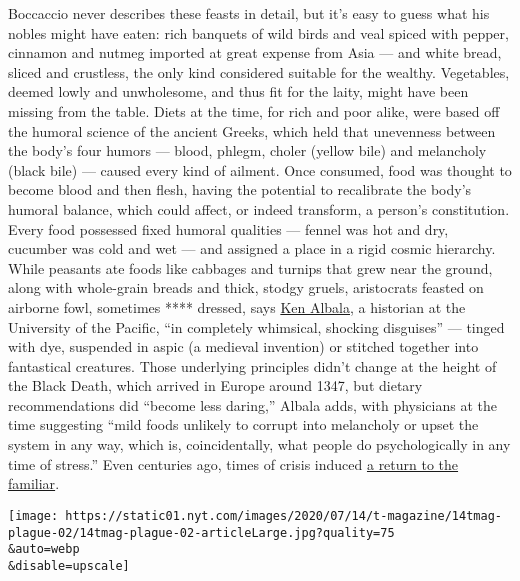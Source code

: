 Boccaccio never describes these feasts in detail, but it's easy to guess
what his nobles might have eaten: rich banquets of wild birds and veal
spiced with pepper, cinnamon and nutmeg imported at great expense from
Asia --- and white bread, sliced and crustless, the only kind considered
suitable for the wealthy. Vegetables, deemed lowly and unwholesome, and
thus fit for the laity, might have been missing from the table. Diets at
the time, for rich and poor alike, were based off the humoral science of
the ancient Greeks, which held that unevenness between the body's four
humors --- blood, phlegm, choler (yellow bile) and melancholy (black
bile) --- caused every kind of ailment. Once consumed, food was thought
to become blood and then flesh, having the potential to recalibrate the
body's humoral balance, which could affect, or indeed transform, a
person's constitution. Every food possessed fixed humoral qualities ---
fennel was hot and dry, cucumber was cold and wet --- and assigned a
place in a rigid cosmic hierarchy. While peasants ate foods like
cabbages and turnips that grew near the ground, along with whole-grain
breads and thick, stodgy gruels, aristocrats feasted on airborne fowl,
sometimes **** dressed, says
\href{https://www.pacific.edu/academics/schools-and-colleges/college-of-the-pacific/academics/departments-and-programs/history/faculty-directory/ken-albala.html}{Ken
Albala}, a historian at the University of the Pacific, ``in completely
whimsical, shocking disguises'' --- tinged with dye, suspended in aspic
(a medieval invention) or stitched together into fantastical creatures.
Those underlying principles didn't change at the height of the Black
Death, which arrived in Europe around 1347, but dietary recommendations
did ``become less daring,'' Albala adds, with physicians at the time
suggesting ``mild foods unlikely to corrupt into melancholy or upset the
system in any way, which is, coincidentally, what people do
psychologically in any time of stress.'' Even centuries ago, times of
crisis induced
\href{https://www.nytimes.com/2020/04/07/business/coronavirus-processed-foods.html}{a
return to the familiar}.

\texttt{[image: https://static01.nyt.com/images/2020/07/14/t-magazine/14tmag-plague-02/14tmag-plague-02-articleLarge.jpg?quality=75\\\&auto=webp\\\&disable=upscale]}

